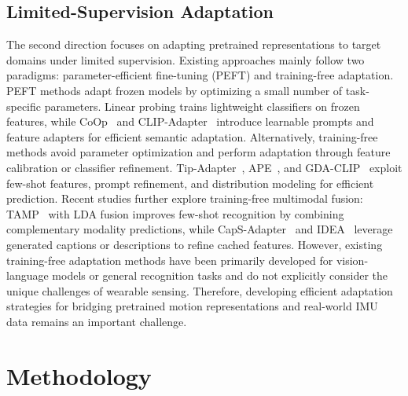 \documentclass[journal]{IEEEtran}
\begin{document}
\subsection{Limited-Supervision Adaptation}

The second direction focuses on adapting pretrained representations to target domains under limited supervision. Existing approaches mainly follow two paradigms: parameter-efficient fine-tuning (PEFT) and training-free adaptation. PEFT methods adapt frozen models by optimizing a small number of task-specific parameters. Linear probing trains lightweight classifiers on frozen features, while CoOp~\cite{coop} and CLIP-Adapter~\cite{clipadapter} introduce learnable prompts and feature adapters for efficient semantic adaptation. Alternatively, training-free methods avoid parameter optimization and perform adaptation through feature calibration or classifier refinement. Tip-Adapter~\cite{tipadapter}, APE~\cite{ape}, and GDA-CLIP~\cite{gdaclip} exploit few-shot features, prompt refinement, and distribution modeling for efficient prediction. Recent studies further explore training-free multimodal fusion: TAMP~\cite{tamp} with LDA fusion improves few-shot recognition by combining complementary modality predictions, while CapS-Adapter~\cite{capsadapter} and IDEA~\cite{idea} leverage generated captions or descriptions to refine cached features. However, existing training-free adaptation methods have been primarily developed for vision-language models or general recognition tasks and do not explicitly consider the unique challenges of wearable sensing. Therefore, developing efficient adaptation strategies for bridging pretrained motion representations and real-world IMU data remains an important challenge.

\section{Methodology}
\label{sec:method}

\end{document}

